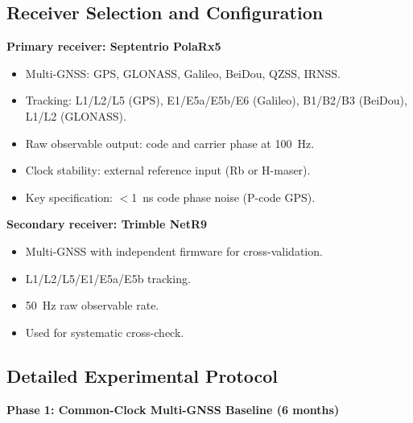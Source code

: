 \documentclass[aps,prd,twocolumn,superscriptaddress,nofootinbib]{revtex4-2}
\begin{document}
\subsection{Receiver Selection and Configuration}

\textbf{Primary receiver: Septentrio PolaRx5}
\begin{itemize}
\item Multi-GNSS: GPS, GLONASS, Galileo, BeiDou, QZSS, IRNSS.
\item Tracking: L1/L2/L5 (GPS), E1/E5a/E5b/E6 (Galileo),
B1/B2/B3 (BeiDou), L1/L2 (GLONASS).
\item Raw observable output: code and carrier phase at 100~Hz.
\item Clock stability: external reference input (Rb or H-maser).
\item Key specification: $<$1~ns code phase noise (P-code GPS).
\end{itemize}

\textbf{Secondary receiver: Trimble NetR9}
\begin{itemize}
\item Multi-GNSS with independent firmware for cross-validation.
\item L1/L2/L5/E1/E5a/E5b tracking.
\item 50~Hz raw observable rate.
\item Used for systematic cross-check.
\end{itemize}

\subsection{Detailed Experimental Protocol}

\textbf{Phase 1: Common-Clock Multi-GNSS Baseline (6 months)}
\end{document}
